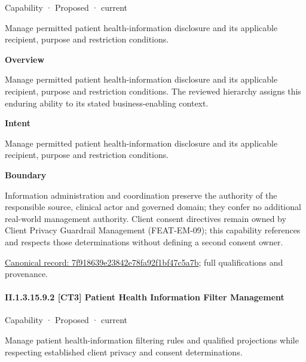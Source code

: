 \label{element:7f918639e23842e78fa92f1bf47c5a7b}
{\small Capability · Proposed · current}\par

Manage permitted patient health-information disclosure and its applicable recipient, purpose and restriction conditions.



\textbf{Overview}



Manage permitted patient health-information disclosure and its applicable recipient, purpose and restriction conditions. The reviewed hierarchy assigns this enduring ability to its stated business-enabling context.



\textbf{Intent}



Manage permitted patient health-information disclosure and its applicable recipient, purpose and restriction conditions.



\textbf{Boundary}



Information administration and coordination preserve the authority of the responsible source, clinical actor and governed domain; they confer no additional real-world management authority. Client consent directives remain owned by Client Privacy Guardrail Management (FEAT-EM-09); this capability references and respects those determinations without defining a second consent owner.


{\footnotesize \href{../../../../continuum/strategy/capability/7f918639e23842e78fa92f1bf47c5a7b.md}{Canonical record: 7f918639e23842e78fa92f1bf47c5a7b}; full qualifications and provenance.}\par
\paragraph*{II.1.3.15.9.2 [CT3] Patient Health Information Filter Management}
\label{navigation:II.1.3.15.9.2}

\label{element:62f673613c76494eba972cad3e4e8d0b}
{\small Capability · Proposed · current}\par

Manage patient health-information filtering rules and qualified projections while respecting established client privacy and consent determinations.



